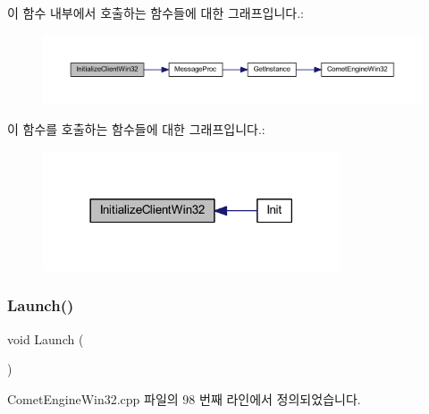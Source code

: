 이 함수 내부에서 호출하는 함수들에 대한 그래프입니다.\+:\nopagebreak
\begin{figure}[H]
\begin{center}
\leavevmode
\includegraphics[width=350pt]{class_comet_engine_1_1_comet_engine_win32_a9f5ac1f01164dfdb7f752e6b4f77e80a_cgraph}
\end{center}
\end{figure}
이 함수를 호출하는 함수들에 대한 그래프입니다.\+:\nopagebreak
\begin{figure}[H]
\begin{center}
\leavevmode
\includegraphics[width=249pt]{class_comet_engine_1_1_comet_engine_win32_a9f5ac1f01164dfdb7f752e6b4f77e80a_icgraph}
\end{center}
\end{figure}
\mbox{\label{class_comet_engine_1_1_comet_engine_win32_abe9b413e3c019ccee4f87ab0071c5aad}} 
\subsubsection{\texorpdfstring{Launch()}{Launch()}}
{\footnotesize\ttfamily void Launch (\begin{DoxyParamCaption}{ }\end{DoxyParamCaption})}



Comet\+Engine\+Win32.\+cpp 파일의 98 번째 라인에서 정의되었습니다.



